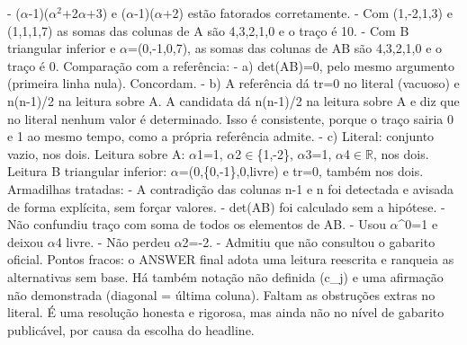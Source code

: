 \documentclass{article}%
\begin{document}
{-} ($\alpha$-1)($\alpha$$^2$+2$\alpha$+3) e ($\alpha$-1)($\alpha$+2) estão fatorados corretamente.\newline%
{-} Com (1,-2,1,3) e (1,1,1,7) as somas das colunas de A são 4,3,2,1,0 e o traço é 10.\newline%
{-} Com B triangular inferior e $\alpha$=(0,-1,0,7), as somas das colunas de AB são 4,3,2,1,0 e o traço é 0.\newline%
\newline%
Comparação com a referência:\newline%
{-} a) det(AB)=0, pelo mesmo argumento (primeira linha nula). Concordam.\newline%
{-} b) A referência dá tr=0 no literal (vacuoso) e n(n-1)/2 na leitura sobre A. A candidata dá n(n-1)/2 na leitura sobre A e diz que no literal nenhum valor é determinado. Isso é consistente, porque o traço sairia 0 e 1 ao mesmo tempo, como a própria referência admite.\newline%
{-} c) Literal: conjunto vazio, nos dois. Leitura sobre A: $\alpha$1=1, $\alpha$2$\in$\{1,-2\}, $\alpha$3=1, $\alpha$4$\in$$\mathbb{R}$, nos dois. Leitura B triangular inferior: $\alpha$=(0,\{0,-1\},0,livre) e tr=0, também nos dois.\newline%
\newline%
Armadilhas tratadas:\newline%
{-} A contradição das colunas n-1 e n foi detectada e avisada de forma explícita, sem forçar valores.\newline%
{-} det(AB) foi calculado sem a hipótese.\newline%
{-} Não confundiu traço com soma de todos os elementos de AB.\newline%
{-} Usou $\alpha$\^{}0=1 e deixou $\alpha$4 livre.\newline%
{-} Não perdeu $\alpha$2=-2.\newline%
{-} Admitiu que não consultou o gabarito oficial.\newline%
\newline%
Pontos fracos: o ANSWER final adota uma leitura reescrita e ranqueia as alternativas sem base. Há também notação não definida (c\_j) e uma afirmação não demonstrada (diagonal = última coluna). Faltam as obstruções extras no literal. É uma resolução honesta e rigorosa, mas ainda não no nível de gabarito publicável, por causa da escolha do headline.%
\end{document}
